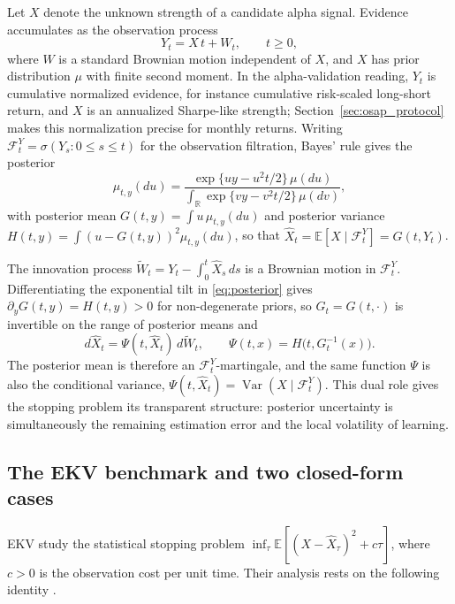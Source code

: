 \documentclass[11pt]{article}
\begin{document}
Let $X$ denote the unknown strength of a candidate alpha signal.  Evidence accumulates
as the observation process
\begin{equation}
    Y_t = X\,t + W_t, \qquad t \ge 0,
    \label{eq:observation_model}
\end{equation}
where $W$ is a standard Brownian motion independent of $X$, and $X$ has prior
distribution $\mu$ with finite second moment.  In the alpha-validation reading, $Y_t$
is cumulative normalized evidence, for instance cumulative risk-scaled long-short
return, and $X$ is an annualized Sharpe-like strength; Section~\ref{sec:osap_protocol}
makes this normalization precise for monthly returns.  Writing
$\mathcal F_t^Y=\sigma(Y_s:0\le s\le t)$ for the observation filtration, Bayes' rule
gives the posterior
\begin{equation}
    \mu_{t,y}(du)
    =
    \frac{\exp\{uy-u^2t/2\}\,\mu(du)}
    {\int_{\mathbb R}\exp\{vy-v^2t/2\}\,\mu(dv)},
    \label{eq:posterior}
\end{equation}
with posterior mean $G(t,y)=\int u\,\mu_{t,y}(du)$ and posterior variance
$H(t,y)=\int(u-G(t,y))^2\mu_{t,y}(du)$, so that
$\widehat X_t=\mathbb E[X\mid\mathcal F_t^Y]=G(t,Y_t)$.

The innovation process $\widetilde W_t=Y_t-\int_0^t\widehat X_s\,ds$ is a Brownian
motion in $\mathcal F_t^Y$.  Differentiating the exponential tilt in
\eqref{eq:posterior} gives $\partial_yG(t,y)=H(t,y)>0$ for non-degenerate priors, so
$G_t=G(t,\cdot)$ is invertible on the range of posterior means and
\begin{equation}
    d\widehat X_t = \Psi(t,\widehat X_t)\,d\widetilde W_t,
    \qquad
    \Psi(t,x) = H\bigl(t,G_t^{-1}(x)\bigr).
    \label{eq:posterior_mean_sde}
\end{equation}
The posterior mean is therefore an $\mathcal F_t^Y$-martingale, and the same function
$\Psi$ is also the conditional variance,
$\Psi(t,\widehat X_t)=\operatorname{Var}(X\mid\mathcal F_t^Y)$.  This dual role gives
the stopping problem its transparent structure: posterior uncertainty is simultaneously
the remaining estimation error and the local volatility of learning.

\subsection{The EKV benchmark and two closed-form cases}
\label{sec:ekv}

EKV study the statistical stopping problem
$\inf_{\tau}\mathbb E[(X-\widehat X_\tau)^2+c\tau]$, where $c>0$ is the observation
cost per unit time.  Their analysis rests on the following identity
\citep[Proposition~3.1]{ekstromKaratzasVaicenavicius2022}.
\end{document}
